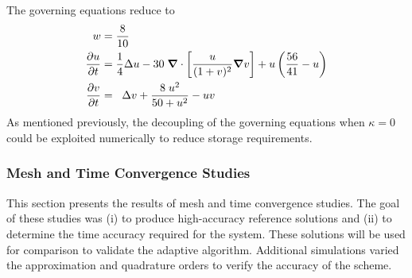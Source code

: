 The governing equations reduce to
\begin{align}
  \label{eq:pde_bio_w_radial_spots_2}
  w &= \frac{8}{10} \\
  \label{eq:pde_bio_u_radial_spots_2}
  \frac{\partial u}{\partial t} & = \frac{1}{4} \Delta u - 30 \; {\boldsymbol{\nabla}} {}\cdot \left[ \frac{u}{(1+ v)^2} {\boldsymbol{\nabla}} {v} \right]
                                    + u \left( \frac{56}{41} - u \right) \\
  \label{eq:pde_bio_v_radial_spots_2}
  \frac{\partial v}{\partial t} & = \;\;\Delta v + \frac{8 \; u^2}{50 + u^2} - uv
\end{align}
As mentioned previously, the decoupling of the governing equations when $\kappa=0$ could be exploited numerically to reduce storage requirements.

\subsubsection{Mesh and Time Convergence Studies}
This section presents the results of mesh and time convergence studies.  The goal of these studies was (i) to produce high-accuracy reference solutions and (ii) to determine the time accuracy required for the system.  These solutions will be used for comparison to validate the adaptive algorithm.  Additional simulations varied the approximation and quadrature orders to verify the accuracy of the scheme.

